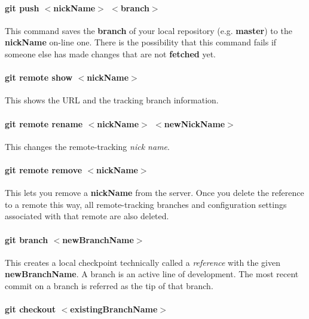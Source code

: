 \documentclass[a4paper, 12pt]{article}
\begin{document}
\paragraph{git push $<$nickName$>$ $<$branch$>$} This command saves the \textbf{branch} of your local repository (e.g. \textbf{master}) to the \textbf{nickName} on-line one. There is the possibility that this command fails if someone else has made changes that are not \textbf{fetched} yet.

\paragraph{git remote show $<$nickName$>$} This shows the URL and the tracking branch information.

\paragraph{git remote rename $<$nickName$>$ $<$newNickName$>$} This changes the remote-tracking \emph{nick name}.

\paragraph{git remote remove $<$nickName$>$} This lets you remove a \textbf{nickName} from the server. Once you delete the reference to a remote this way, all remote-tracking branches and configuration settings associated with that remote are also deleted. 










\paragraph{git branch $<$newBranchName$>$}
This creates a local checkpoint technically called a \emph{reference} with the given \textbf{newBranchName}. A branch is an active line of development. The most recent commit on a branch is referred as the tip of that branch.

\paragraph{git checkout $<$existingBranchName$>$}
\end{document}
